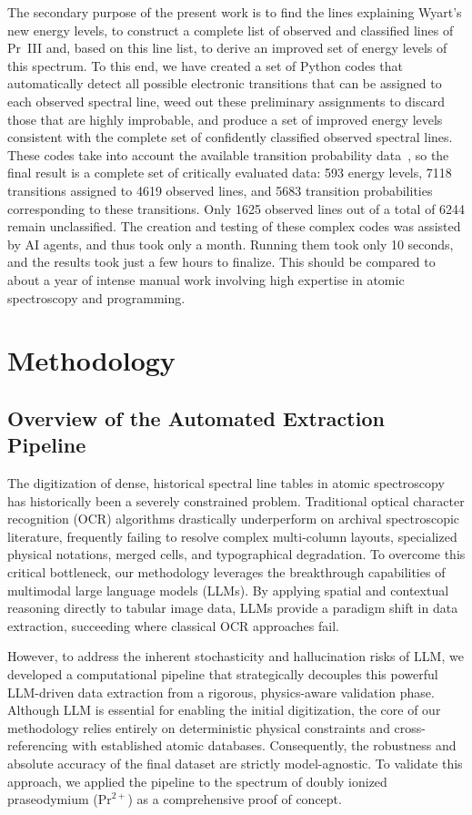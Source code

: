 \documentclass[10pt]{article}
\begin{document}
The secondary purpose of the present work is to find the lines explaining Wyart's new energy levels, to construct a complete list of observed and classified lines of Pr~III and, based on this line list, to derive an improved set of energy levels of this spectrum. To this end, we have created a set of Python codes that automatically detect all possible electronic transitions that can be assigned to each observed spectral line, weed out these preliminary assignments to discard those that are highly improbable, and produce a set of improved energy levels consistent with the complete set of confidently classified observed spectral lines. These codes take into account the available transition probability data~\cite{DREAM}, so the final result is a complete set of critically evaluated data: 593 energy levels, 7118 transitions assigned to 4619 observed lines, and 5683 transition probabilities corresponding to these transitions. Only 1625 observed lines out of a total of 6244 remain unclassified. The creation and testing of these complex codes was assisted by AI agents, and thus took only a month. Running them took only 10 seconds, and the results took just a few hours to finalize. This should be compared to about a year of intense manual work involving high expertise in atomic spectroscopy and programming.

\section{Methodology}

\subsection{Overview of the Automated Extraction Pipeline}
The digitization of dense, historical spectral line tables in atomic spectroscopy has historically been a severely constrained problem. Traditional optical character recognition (OCR) algorithms drastically underperform on archival spectroscopic literature, frequently failing to resolve complex multi-column layouts, specialized physical notations, merged cells, and typographical degradation. To overcome this critical bottleneck, our methodology leverages the breakthrough capabilities of multimodal large language models (LLMs). By applying spatial and contextual reasoning directly to tabular image data, LLMs provide a paradigm shift in data extraction, succeeding where classical OCR approaches fail.

However, to address the inherent stochasticity and hallucination risks of LLM, we developed a computational pipeline that strategically decouples this powerful LLM-driven data extraction from a rigorous, physics-aware validation phase. Although LLM is essential for enabling the initial digitization, the core of our methodology relies entirely on deterministic physical constraints and cross-referencing with established atomic databases. Consequently, the robustness and absolute accuracy of the final dataset are strictly model-agnostic. To validate this approach, we applied the pipeline to the spectrum of doubly ionized praseodymium ($\text{Pr}^{2+}$) as a comprehensive proof of concept.
\end{document}
